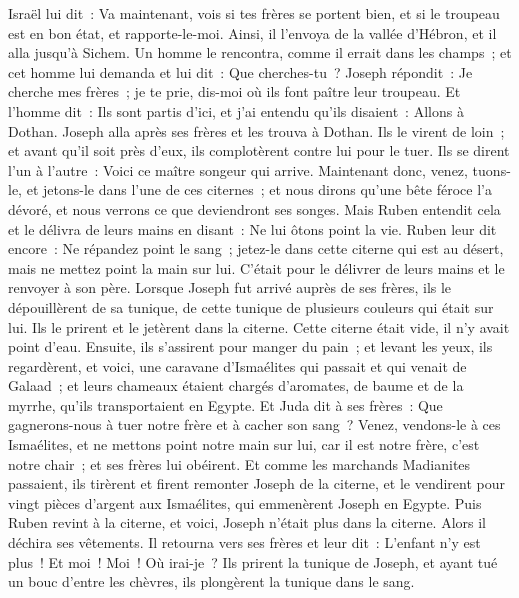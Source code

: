 \begin{multicols}{2}
Israël lui dit~: Va maintenant, vois si tes frères se portent bien, et si le troupeau est en bon état, et rapporte-le-moi. Ainsi, il l'envoya de la vallée d'Hébron, et il alla jusqu'à Sichem.
Un homme le rencontra, comme il errait dans les champs~; et cet homme lui demanda et lui dit~: Que cherches-tu~?
Joseph répondit~: Je cherche mes frères~; je te prie, dis-moi où ils font paître leur troupeau.
Et l'homme dit~: Ils sont partis d'ici, et j'ai entendu qu'ils disaient~: Allons à Dothan. Joseph alla après ses frères et les trouva à Dothan.
Ils le virent de loin~; et avant qu'il soit près d'eux, ils complotèrent contre lui pour le tuer.
Ils se dirent l'un à l'autre~: Voici ce maître songeur qui arrive.
 Maintenant donc, venez, tuons-le, et jetons-le dans l'une de ces citernes~; et nous dirons qu'une bête féroce l'a dévoré, et nous verrons ce que deviendront ses songes.
Mais Ruben entendit cela et le délivra de leurs mains en disant~: Ne lui ôtons point la vie.
Ruben leur dit encore~: Ne répandez point le sang~; jetez-le dans cette citerne qui est au désert, mais ne mettez point la main sur lui. C'était pour le délivrer de leurs mains et le renvoyer à son père.
Lorsque Joseph fut arrivé auprès de ses frères, ils le dépouillèrent de sa tunique, de cette tunique de plusieurs couleurs qui était sur lui.
Ils le prirent et le jetèrent dans la citerne. Cette citerne était vide, il n'y avait point d'eau.
Ensuite, ils s'assirent pour manger du pain~; et levant les yeux, ils regardèrent, et voici, une caravane d'Ismaélites qui passait et qui venait de Galaad~; et leurs chameaux étaient chargés d'aromates, de baume et de la myrrhe, qu'ils transportaient en Egypte.
Et Juda dit à ses frères~: Que gagnerons-nous à tuer notre frère et à cacher son sang~?
Venez, vendons-le à ces Ismaélites, et ne mettons point notre main sur lui, car il est notre frère, c'est notre chair~; et ses frères lui obéirent.
Et comme les marchands Madianites passaient, ils tirèrent et firent remonter Joseph de la citerne, et le vendirent pour vingt pièces d'argent aux Ismaélites, qui emmenèrent Joseph en Egypte.
Puis Ruben revint à la citerne, et voici, Joseph n'était plus dans la citerne. Alors il déchira ses vêtements.
Il retourna vers ses frères et leur dit~: L'enfant n'y est plus~! Et moi~! Moi~! Où irai-je~?
Ils prirent la tunique de Joseph, et ayant tué un bouc d'entre les chèvres, ils plongèrent la tunique dans le sang.

\end{multicols}
